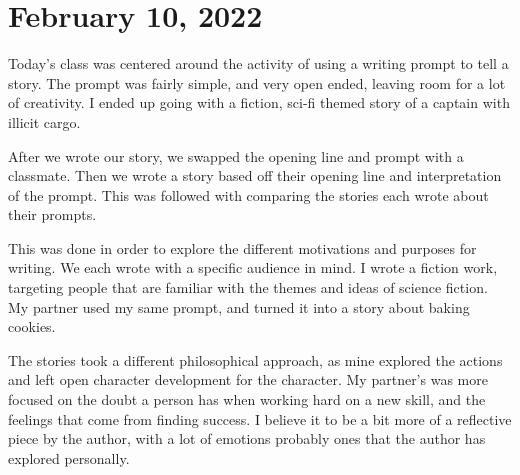 \documentclass[journal.tex]{subfiles}
\begin{document}
\pagebreak
\section*{February 10, 2022}

Today's class was centered around the activity of using a writing prompt to tell a story.
The prompt was fairly simple, and very open ended, leaving room for a lot of creativity.
I ended up going with a fiction, sci-fi themed story of a captain with illicit cargo.

After we wrote our story, we swapped the opening line and prompt with a classmate.
Then we wrote a story based off their opening line and interpretation of the prompt.
This was followed with comparing the stories each wrote about their prompts.

This was done in order to explore the different motivations and purposes for writing.
We each wrote with a specific audience in mind.
I wrote a fiction work, targeting people that are familiar with the themes and ideas of science fiction.
My partner used my same prompt, and turned it into a story about baking cookies.

The stories took a different philosophical approach, as mine explored the actions and left open character development for the character.
My partner's was more focused on the doubt a person has when working hard on a new skill, and the feelings that come from finding success.
I believe it to be a bit more of a reflective piece by the author, with a lot of emotions probably ones that the author has explored personally.
\end{document}
